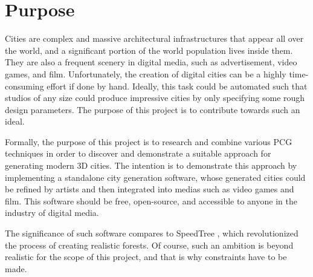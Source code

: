 \section{Purpose}


Cities are complex and massive architectural infrastructures that appear all over the world, and a significant portion of the world population lives inside them.
They are also a frequent scenery in digital media, such as advertisement, video games, and film.
Unfortunately, the creation of digital cities can be a highly time-consuming effort if done by hand.
Ideally, this task could be automated such that studios of any size could produce impressive cities by only specifying some rough design parameters.
The purpose of this project is to contribute towards such an ideal.

Formally, the purpose of this project is to research and combine various PCG techniques in order to discover and demonstrate a suitable approach for generating modern 3D cities. 
The intention is to demonstrate this approach by implementing a standalone city generation software, whose generated cities could be refined by artists and then integrated into medias such as video games and film.
This software should be free, open-source, and accessible to anyone in the industry of digital media.

The significance of such software compares to SpeedTree \cite{speedtree}, which revolutionized the process of creating realistic forests.
Of course, such an ambition is beyond realistic for the scope of this project, and that is why constraints have to be made.